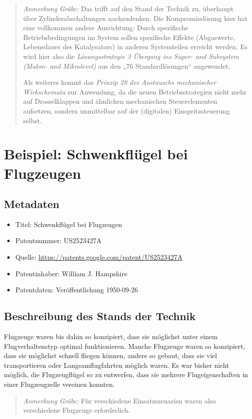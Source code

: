 \documentclass[11pt,a4paper]{article}
\newcommand{\HGG}[1]{\begin{quote} \emph{Anmerkung Gräbe:} #1  \end{quote}}
\begin{document}
\HGG{Das trifft auf den Stand der Technik zu, überhaupt über
  Zylinderabschaltungen nachzudenken.  Die Kompromisslösung hier hat eine
  vollkommen andere Ausrichtung: Durch spezifische Betriebsbedingungen im
  System sollen spezifische Effekte (Abgaswerte, Lebensdauer des Katalysators)
  in anderen Systemteilen erreicht werden. Es wird hier also die
  \emph{Lösungsstrategie 3 Übergang ins Super- und Subsystem (Makro- und
    Mikrolevel)} aus den „76 Standardlösungen“ angewendet. 

  Als weiteres kommt das \emph{Prinzip 28 des Austauschs mechanischer
    Wirkschemata} zur Anwendung, da die neuen Betriebsstrategien nicht mehr
  auf Drosselklappen und ähnlichen mechanischen Steuerelementen aufsetzen,
  sondern unmittelbar auf der (digitalen) Einspritzsteuerung selbst. }

\section{Beispiel: Schwenkflügel bei Flugzeugen}
\subsection{Metadaten}
\begin{itemize}\itemsep0pt
\item Titel: Schwenkflügel bei Flugzeugen
\item Patentnummer: US2523427A
\item Quelle: \url{https://patents.google.com/patent/US2523427A}
\item Patentinhaber:  William J. Hampshire
\item Patentdaten: Veröffentlichung 1950-09-26
\end{itemize}

\subsection{Beschreibung des Stands der Technik}
Flugzeuge waren bis dahin so konzipiert, dass sie möglichst unter einem
Flugverhaltenstyp optimal funktionieren. Manche Flugzeuge waren so konzipiert,
dass sie möglichst schnell fliegen können, andere so gebaut, dass sie viel
transportieren oder Langsamflugfahrten möglich waren. Es war bisher nicht
möglich, die Flugzeugflügel so zu entwerfen, dass sie mehrere
Flugeigenschaften in einer Flugzeugzelle vereinen konnten.

\HGG{Für verschiedene Einsatzszenarien waren also verschiedene Flugzeuge
  erforderlich.} 
\end{document}
